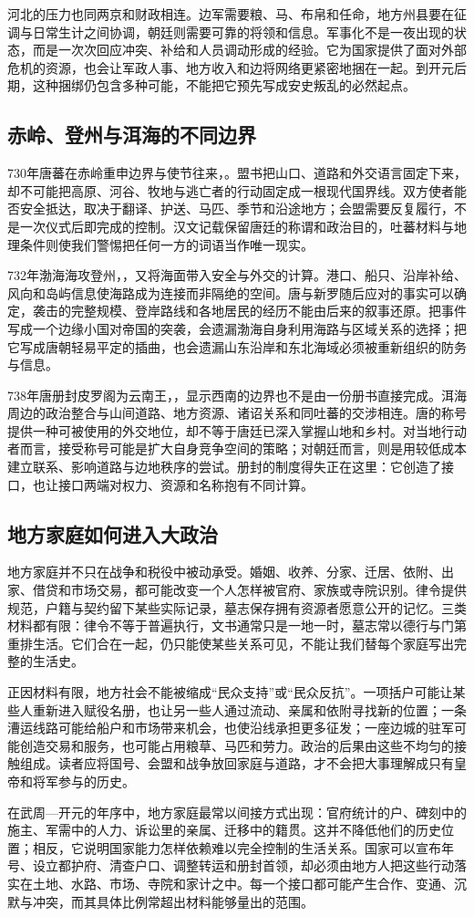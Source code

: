 河北的压力也同两京和财政相连。边军需要粮、马、布帛和任命，地方州县要在征调与日常生计之间协调，朝廷则需要可靠的将领和信息。军事化不是一夜出现的状态，而是一次次回应冲突、补给和人员调动形成的经验。它为国家提供了面对外部危机的资源，也会让军政人事、地方收入和边将网络更紧密地捆在一起。到开元后期，这种捆绑仍包含多种可能，不能把它预先写成安史叛乱的必然起点。

\subsection{赤岭、登州与洱海的不同边界}
730年唐蕃在赤岭重申边界与使节往来，。盟书把山口、道路和外交语言固定下来，却不可能把高原、河谷、牧地与逃亡者的行动固定成一根现代国界线。双方使者能否安全抵达，取决于翻译、护送、马匹、季节和沿途地方；会盟需要反复履行，不是一次仪式后即完成的控制。汉文记载保留唐廷的称谓和政治目的，吐蕃材料与地理条件则使我们警惕把任何一方的词语当作唯一现实。

732年渤海海攻登州，，又将海面带入安全与外交的计算。港口、船只、沿岸补给、风向和岛屿信息使海路成为连接而非隔绝的空间。唐与新罗随后应对的事实可以确定，袭击的完整规模、登岸路线和各地居民的经历不能由后来的叙事还原。把事件写成一个边缘小国对帝国的突袭，会遗漏渤海自身利用海路与区域关系的选择；把它写成唐朝轻易平定的插曲，也会遗漏山东沿岸和东北海域必须被重新组织的防务与信息。

738年唐册封皮罗阁为云南王，，显示西南的边界也不是由一份册书直接完成。洱海周边的政治整合与山间道路、地方资源、诸诏关系和同吐蕃的交涉相连。唐的称号提供一种可被使用的外交地位，却不等于唐廷已深入掌握山地和乡村。对当地行动者而言，接受称号可能是扩大自身竞争空间的策略；对朝廷而言，则是用较低成本建立联系、影响道路与边地秩序的尝试。册封的制度得失正在这里：它创造了接口，也让接口两端对权力、资源和名称抱有不同计算。

\subsection{地方家庭如何进入大政治}
地方家庭并不只在战争和税役中被动承受。婚姻、收养、分家、迁居、依附、出家、借贷和市场交易，都可能改变一个人怎样被官府、家族或寺院识别。律令提供规范，户籍与契约留下某些实际记录，墓志保存拥有资源者愿意公开的记忆。三类材料都有限：律令不等于普遍执行，文书通常只是一地一时，墓志常以德行与门第重排生活。它们合在一起，仍只能使某些关系可见，不能让我们替每个家庭写出完整的生活史。

正因材料有限，地方社会不能被缩成“民众支持”或“民众反抗”。一项括户可能让某些人重新进入赋役名册，也让另一些人通过流动、亲属和依附寻找新的位置；一条漕运线路可能给船户和市场带来机会，也使沿线承担更多征发；一座边城的驻军可能创造交易和服务，也可能占用粮草、马匹和劳力。政治的后果由这些不均匀的接触组成。读者应将国号、会盟和战争放回家庭与道路，才不会把大事理解成只有皇帝和将军参与的历史。

在武周—开元的年序中，地方家庭最常以间接方式出现：官府统计的户、碑刻中的施主、军需中的人力、诉讼里的亲属、迁移中的籍贯。这并不降低他们的历史位置；相反，它说明国家能力怎样依赖难以完全控制的生活关系。国家可以宣布年号、设立都护府、清查户口、调整转运和册封首领，却必须由地方人把这些行动落实在土地、水路、市场、寺院和家计之中。每一个接口都可能产生合作、变通、沉默与冲突，而其具体比例常超出材料能够量出的范围。
